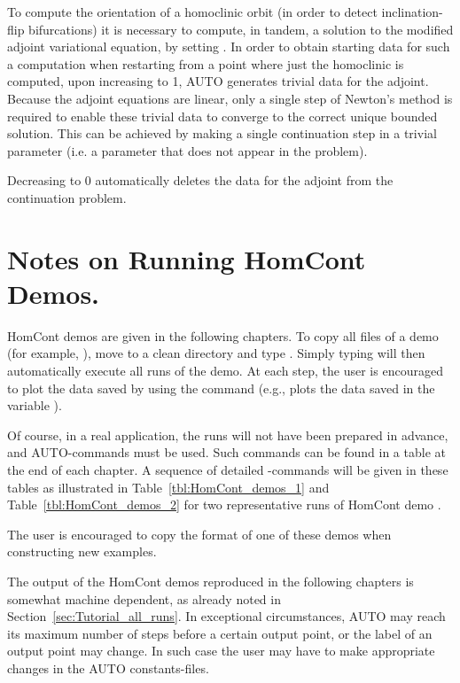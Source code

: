 \documentclass[12pt]{report}
\begin{document}
To compute the orientation of a homoclinic orbit (in order to detect
inclination-flip bifurcations) it is necessary to compute, in tandem,
a solution to the modified adjoint variational equation, by setting
. In order to obtain starting data for such a
computation when restarting from a point where just the homoclinic
is computed, upon increasing  to 1, {\cal AUTO} generates
trivial data for the adjoint. Because the adjoint equations are
linear, only a single step of Newton's method is required to
enable these trivial data to converge to the correct unique bounded
solution. This can be achieved by making a single continuation step in a
trivial parameter (i.e. a parameter that does not appear
in the problem). 

Decreasing  to 0 automatically deletes the data for the adjoint
from the continuation problem.


\section{ Notes on Running {\cal HomCont} Demos.} \label{sec:HomCont_Tutorial_examples}
{\cal HomCont} demos are given in the following chapters.
To copy all files of a demo  (for example, ),
move to a clean directory and type .
Simply typing  will then automatically
execute all runs of the demo.
At each step, the user is encouraged to plot the data
saved by using the command  (e.g., 
plots the data saved in the \python variable ).

Of course, in a real application, the runs will not have been prepared
in advance, and {\cal AUTO}-commands must be used.
Such commands can be found in a table at the end of each chapter.
A sequence of detailed \AUTO-commands will be given in these tables
as illustrated in Table~\ref{tbl:HomCont_demos_1}
and Table~\ref{tbl:HomCont_demos_2} for two representative runs of 
{\cal HomCont} demo .

The user is encouraged to copy the format of one of these demos
when constructing new examples.

The output of the {\cal HomCont} demos reproduced in  the following chapters
is somewhat machine dependent, as already noted 
in Section~\ref{sec:Tutorial_all_runs}.
In exceptional circumstances, {\cal AUTO} may reach its maximum number of
steps  before a certain output point, or the label of
an output point may change. In such case the user may have
to make appropriate changes in the {\cal AUTO} constants-files.
\end{document}

